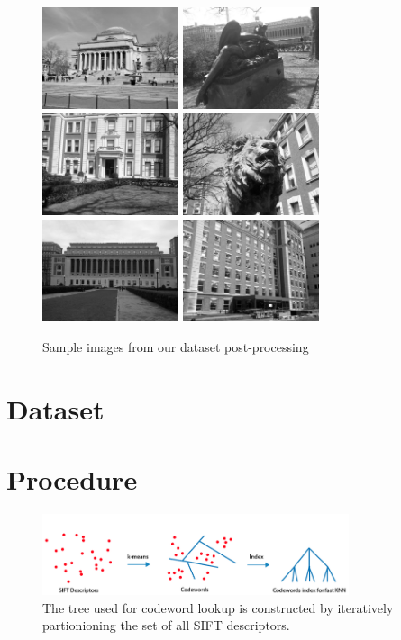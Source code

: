 \documentclass[twocolumn]{article}
\newcommand{\sectionfile}[3]{\section{#1} \label{sec:#2} }
\begin{document}
\begin{figure}
\includegraphics[width=40mm]{sample_data1.jpg}
\includegraphics[width=40mm]{sample_data2.jpg}
\includegraphics[width=40mm]{sample_data3.jpg}
\includegraphics[width=40mm]{sample_data4.jpg}
\includegraphics[width=40mm]{sample_data5.jpg}
\includegraphics[width=40mm]{sample_data6.jpg}
\caption{Sample images from our dataset post-processing}
\label{overflow}
\end{figure}
\sectionfile{Dataset}{dataset}{dataset.tex}
\sectionfile{Procedure}{procedure}{procedure.tex}
\begin{figure}
\includegraphics[width=90mm]{procedure1.png}
\caption{The tree used for codeword lookup is constructed by iteratively partionioning the set of all SIFT descriptors.}
\end{figure}
\end{document}
